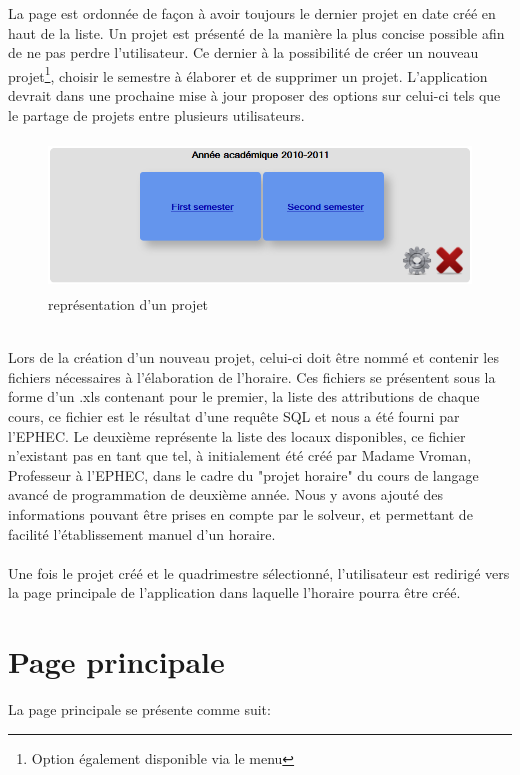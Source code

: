 La page est ordonnée de façon à avoir toujours le dernier projet en date créé en haut de la liste. Un projet est présenté de la manière la plus concise possible afin de ne pas perdre l'utilisateur. Ce dernier à la possibilité de créer un nouveau projet\footnote{Option également disponible via le menu}, choisir le semestre à élaborer et de supprimer un projet. L'application devrait dans une prochaine mise à jour proposer des options sur celui-ci tels que le partage de projets entre plusieurs utilisateurs.\\
\begin{figure}[!h]
	\begin{center}
	\includegraphics[width=12cm,height=4cm]{project.png}	
	\caption{représentation d'un projet}
\end{center}
\end{figure}
\\Lors de la création d'un nouveau projet, celui-ci doit être nommé et contenir les fichiers nécessaires à l'élaboration de l'horaire. Ces fichiers se présentent sous la forme d'un .xls contenant pour le premier, la liste des attributions de chaque cours, ce fichier est le résultat d'une requête SQL et nous a été fourni par l'EPHEC. Le deuxième représente la liste des locaux disponibles, ce fichier n'existant pas en tant que tel, à initialement été créé par Madame Vroman, Professeur à l'EPHEC, dans le cadre du "projet horaire" du cours de langage avancé de programmation de deuxième année. Nous y avons ajouté des informations pouvant être prises en compte par le solveur, et permettant de facilité l'établissement manuel d'un horaire.\\
\\
Une fois le projet créé et le quadrimestre sélectionné, l'utilisateur est redirigé vers la page principale de l'application dans laquelle l'horaire pourra être créé.

\section{Page principale}
La page principale se présente comme suit:\\

